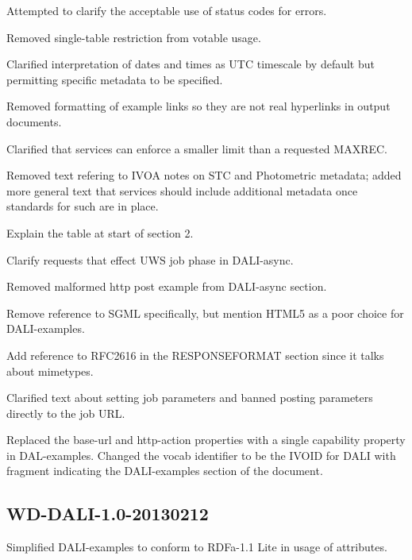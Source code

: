 \documentclass[11pt,letter]{ivoa}
\begin{document}
Attempted to clarify the acceptable use of status codes for errors.

Removed single-table restriction from votable usage.

Clarified interpretation of dates and times as UTC timescale by default but 
permitting specific metadata to be specified.

Removed formatting of example links so they are not real hyperlinks in output 
documents.

Clarified that services can enforce a smaller limit than a requested MAXREC.

Removed text refering to IVOA notes on STC and Photometric metadata; added more 
general text that services should include additional metadata once standards for 
such are in place.

Explain the table at start of section 2.

Clarify requests that effect UWS job phase in DALI-async.

Removed malformed http post example from DALI-async section.

Remove reference to SGML specifically, but mention HTML5 as a poor choice for 
DALI-examples.

Add reference to RFC2616 in the RESPONSEFORMAT section since it talks about 
mimetypes.

Clarified text about setting job parameters and banned posting parameters 
directly to the job URL.

Replaced the base-url and http-action properties with a single capability 
property in DAL-examples. Changed the vocab identifier to be the IVOID for DALI 
with fragment indicating the DALI-examples section of the document.

\subsection{WD-DALI-1.0-20130212}
Simplified DALI-examples to conform to RDFa-1.1 Lite in usage of attributes.


\end{document}

